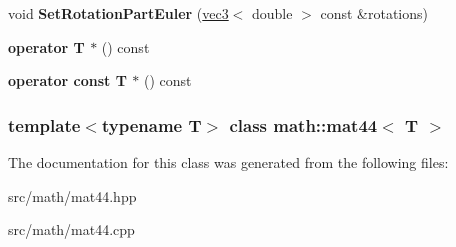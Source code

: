 \begin{DoxyCompactItemize}
\item 
\hypertarget{classmath_1_1mat44_a3e2319531f33cb187cdb6a521b2bcd50}{
void {\bfseries SetRotationPartEuler} (\hyperlink{classmath_1_1vec3}{vec3}$<$ double $>$ const \&rotations)}
\label{classmath_1_1mat44_a3e2319531f33cb187cdb6a521b2bcd50}

\item 
\hypertarget{classmath_1_1mat44_a20dcec664e454262299ac5b873002b76}{
{\bfseries operator T $\ast$} () const }
\label{classmath_1_1mat44_a20dcec664e454262299ac5b873002b76}

\item 
\hypertarget{classmath_1_1mat44_a0595a19c2b67bc5e81037ea7490d5d51}{
{\bfseries operator const T $\ast$} () const }
\label{classmath_1_1mat44_a0595a19c2b67bc5e81037ea7490d5d51}

\end{DoxyCompactItemize}
\subsubsection*{template$<$typename T$>$ class math::mat44$<$ T $>$}



The documentation for this class was generated from the following files:\begin{DoxyCompactItemize}
\item 
src/math/mat44.hpp\item 
src/math/mat44.cpp\end{DoxyCompactItemize}
